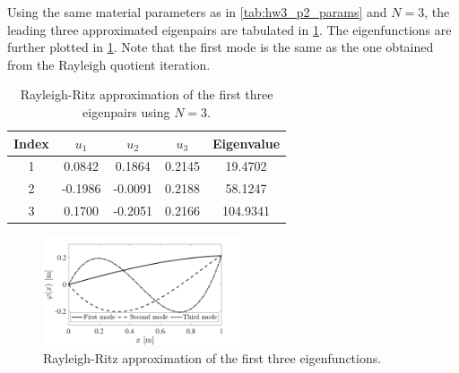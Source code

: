\begin{enumerate}[(i)]
{    Using the same material parameters as in \cref{tab:hw3_p2_params} and $N = 3$, the leading three approximated eigenpairs are tabulated in \cref{tab:hw3_p2_rr_results}.
    The eigenfunctions are further plotted in \cref{fig:hw3_p2_rr_results}. 
    Note that the first mode is the same as the one obtained from the Rayleigh quotient iteration.
    \begin{table}[!ht]
        \centering
        \begin{tabular}{|c|c|c|c|c|}
            \hline
            Index & $u_1$ & $u_2$ & $u_3$ & Eigenvalue \\
            \hline 
            1 & 0.0842 & 0.1864 & 0.2145 & 19.4702 \\
            \hline 
            2 & -0.1986 & -0.0091 & 0.2188 & 58.1247 \\
            \hline 
            3 & 0.1700 & -0.2051 & 0.2166 & 104.9341 \\
            \hline 
        \end{tabular}
        \caption{Rayleigh-Ritz approximation of the first three eigenpairs using $N = 3$. }
        \label{tab:hw3_p2_rr_results}
    \end{table}
    \begin{figure}[!ht]
        \centering
        \includegraphics[width=0.52\textwidth]{homework/hw3/assets/hw3_p2_rr.pdf}
        \caption{Rayleigh-Ritz approximation of the first three eigenfunctions.}
        \label{fig:hw3_p2_rr_results}
    \end{figure}
}
\end{enumerate}

